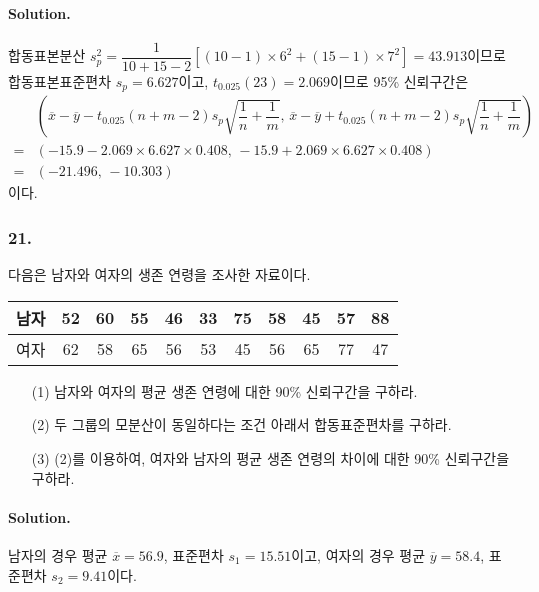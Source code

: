 \paragraph{Solution.} 합동표본분산 $s_p^2=\dfrac{1}{10+15-2}\left[\left(10-1\right)\times6^2+\left(15-1\right)\times7^2\right]=43.913$이므로
합동표본표준편차 $s_p=6.627$이고, $t_{0.025}\left(23\right)=2.069$이므로 95\% 신뢰구간은
\begin{align*}
    & \left(\overline{x}-\overline{y}-t_{0.025}\left(n+m-2\right)s_p\sqrt{\dfrac{1}{n}+\dfrac{1}{m}},\,\overline{x}-\overline{y}+t_{0.025}\left(n+m-2\right)s_p\sqrt{\dfrac{1}{n}+\dfrac{1}{m}}\right)\\
   =& \left(-15.9-2.069\times6.627\times0.408,\,-15.9+2.069\times6.627\times0.408\right) \\
   =& \left(-21.496,\,-10.303\right)
\end{align*}
이다.

\subsubsection{21.} 다음은 남자와 여자의 생존 연령을 조사한 자료이다.

\begin{center}
    \begin{tabular}{l|cccccccccc}
        \hline
        남자 & 52 & 60 & 55 & 46 & 33 & 75 & 58 & 45 & 57 & 88 \\
        \hline
        여자 & 62 & 58 & 65 & 56 & 53 & 45 & 56 & 65 & 77 & 47 \\
        \hline
    \end{tabular}
\end{center}

\begin{itemize}
    \item[(1)] 남자와 여자의 평균 생존 연령에 대한 90\% 신뢰구간을 구하라.
    \item[(2)] 두 그룹의 모분산이 동일하다는 조건 아래서 합동표준편차를 구하라.
    \item[(3)] (2)를 이용하여, 여자와 남자의 평균 생존 연령의 차이에 대한 90\% 신뢰구간을 구하라.  
\end{itemize}

\paragraph{Solution.} 남자의 경우 평균 $\overline{x}=56.9$, 표준편차 $s_1=15.51$이고,
여자의 경우 평균 $\overline{y}=58.4$, 표준편차 $s_2=9.41$이다.

